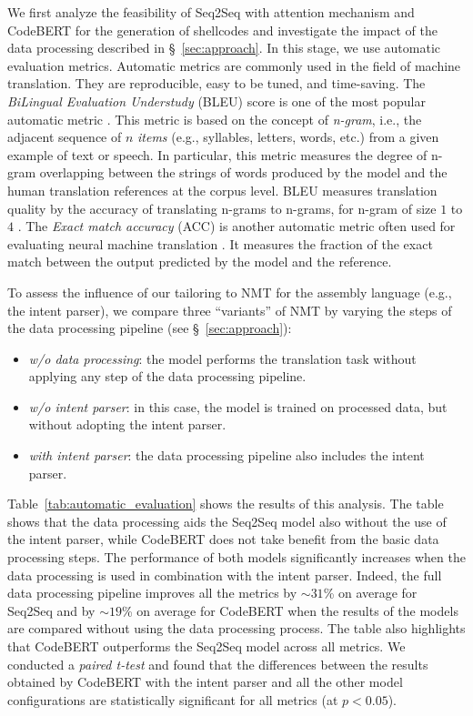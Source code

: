 We first analyze the feasibility of Seq2Seq with attention mechanism and CodeBERT for the generation of shellcodes and investigate the impact of the data processing described in \S{}~\ref{sec:approach}. In this stage, we use automatic evaluation metrics. 
Automatic metrics are commonly used in the field of machine translation. They are reproducible, easy to be tuned, and time-saving. The \emph{BiLingual Evaluation Understudy} (BLEU) \cite{papineni2002bleu} score is one of the most popular automatic metric \cite{oda2015learning,DBLP:journals/corr/LingGHKSWB16,gemmell2020relevance,tran2019does}. This metric is based on the concept of \textit{n-gram}, i.e., the adjacent sequence of $n$ \textit{items} (e.g., syllables, letters, words, etc.) from a given example of text or speech. In particular, this metric measures the degree of n-gram overlapping between the strings of words produced by the model and the human translation references at the corpus level. BLEU measures translation quality by the accuracy of translating n-grams to n-grams, for n-gram of size $1$ to $4$ \cite{han2016machine}.
The \emph{Exact match accuracy} (ACC) is another automatic metric often used for evaluating neural machine translation  \cite{DBLP:journals/corr/LingGHKSWB16,yin2017syntactic,yin2018tranx,yin2019reranking}. It measures the fraction of the exact match between the output predicted by the model and the reference.

To assess the influence of our tailoring to NMT for the assembly language (e.g., the intent parser), we compare three ``variants'' of NMT by varying the steps of the data processing pipeline (see \S~\ref{sec:approach}):
\begin{itemize}
    \item \textit{w/o data processing}: the model performs the translation task without applying any step of the data processing pipeline. 
    \item \textit{w/o intent parser}: in this case, the model is trained on processed data, but without adopting the intent parser.
    \item \textit{with intent parser}: the data processing pipeline also includes the intent parser. 
\end{itemize}

Table~\ref{tab:automatic_evaluation} shows the results of this analysis. 
The table shows that the data processing aids the Seq2Seq model also without the use of the intent parser, while CodeBERT does not take benefit from the basic data processing steps. The performance of both models significantly increases when the data processing is used in combination with the intent parser. Indeed, the full data processing pipeline improves all the metrics by $\sim31$\% on average for Seq2Seq and by $\sim19$\% on average for CodeBERT when the results of the models are compared without using the data processing process. 
The table also highlights that CodeBERT outperforms the Seq2Seq model across all metrics. We conducted a \textit{paired t-test} and found that the differences between the results obtained by CodeBERT with the intent parser and all the other model configurations are statistically significant for all metrics (at $p<0.05$). 


